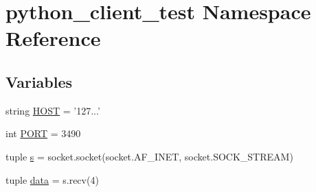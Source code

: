 \hypertarget{namespacepython__client__test}{\section{python\-\_\-client\-\_\-test Namespace Reference}
\label{namespacepython__client__test}
}
\subsection*{Variables}
\begin{DoxyCompactItemize}
\item 
string \hyperlink{namespacepython__client__test_a92606c7a15210740590acd070e01df55}{H\-O\-S\-T} = '127...'
\item 
int \hyperlink{namespacepython__client__test_ad1345f8ee5062de9e8a7ed7efdf18ac7}{P\-O\-R\-T} = 3490
\item 
tuple \hyperlink{namespacepython__client__test_afe25ba75e651f13976e71c474188ef96}{s} = socket.\-socket(socket.\-A\-F\-\_\-\-I\-N\-E\-T, socket.\-S\-O\-C\-K\-\_\-\-S\-T\-R\-E\-A\-M)
\item 
tuple \hyperlink{namespacepython__client__test_af417809fb76fdba5961ee4e000ccde71}{data} = s.\-recv(4)
\end{DoxyCompactItemize}


